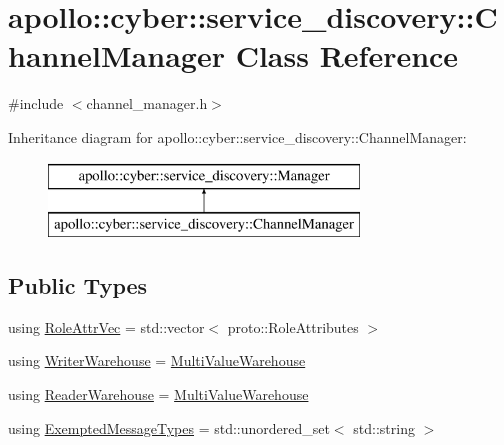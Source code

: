 \hypertarget{classapollo_1_1cyber_1_1service__discovery_1_1ChannelManager}{\section{apollo\-:\-:cyber\-:\-:service\-\_\-discovery\-:\-:Channel\-Manager Class Reference}
\label{classapollo_1_1cyber_1_1service__discovery_1_1ChannelManager}
}


{\ttfamily \#include $<$channel\-\_\-manager.\-h$>$}

Inheritance diagram for apollo\-:\-:cyber\-:\-:service\-\_\-discovery\-:\-:Channel\-Manager\-:\begin{figure}[H]
\begin{center}
\leavevmode
\includegraphics[height=2.000000cm]{classapollo_1_1cyber_1_1service__discovery_1_1ChannelManager}
\end{center}
\end{figure}
\subsection*{Public Types}
\begin{DoxyCompactItemize}
\item 
using \hyperlink{classapollo_1_1cyber_1_1service__discovery_1_1ChannelManager_a3690fc3677abdb994d1de9b996f66cf6}{Role\-Attr\-Vec} = std\-::vector$<$ proto\-::\-Role\-Attributes $>$
\item 
using \hyperlink{classapollo_1_1cyber_1_1service__discovery_1_1ChannelManager_ab34e0a39795d6002f20de1388e8e099b}{Writer\-Warehouse} = \hyperlink{classapollo_1_1cyber_1_1service__discovery_1_1MultiValueWarehouse}{Multi\-Value\-Warehouse}
\item 
using \hyperlink{classapollo_1_1cyber_1_1service__discovery_1_1ChannelManager_adf7b96601a2dec7f06fb190d1a7b537d}{Reader\-Warehouse} = \hyperlink{classapollo_1_1cyber_1_1service__discovery_1_1MultiValueWarehouse}{Multi\-Value\-Warehouse}
\item 
using \hyperlink{classapollo_1_1cyber_1_1service__discovery_1_1ChannelManager_a5ce07d9955d5944b039583db211c2d25}{Exempted\-Message\-Types} = std\-::unordered\-\_\-set$<$ std\-::string $>$
\end{DoxyCompactItemize}
